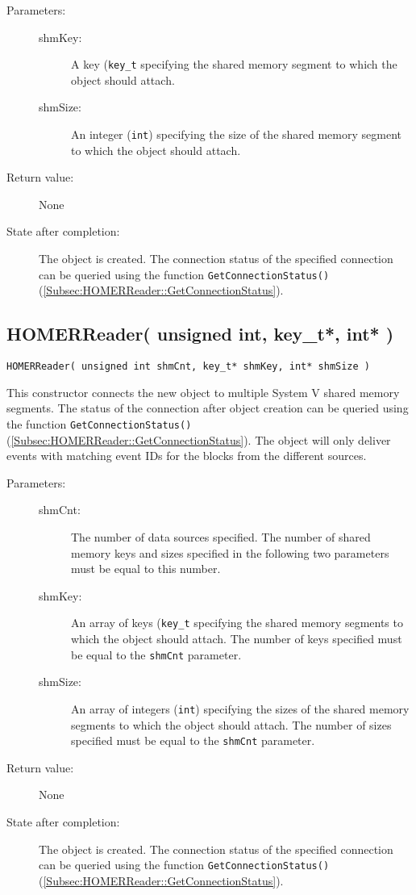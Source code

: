 \documentclass[a4paper,twoside]{article}
\begin{document}
\begin{description}
\item[Parameters:]
	\begin{description}
	\item[shmKey:] A key (\texttt{key\_t} specifying the shared memory segment to which the object should attach.
	\item[shmSize:] An integer (\texttt{int}) specifying the size of the shared memory segment to which the object should attach.
	\end{description}
\item[Return value:] None
\item[State after completion:] The object is created. The connection status of the specified connection can be queried
using the function \texttt{GetConnectionStatus()} (\ref{Subsec:HOMERReader::GetConnectionStatus}). 
\end{description}


\subsection{HOMERReader( unsigned int, key\_t*, int* )}

\texttt{HOMERReader( unsigned int shmCnt, key\_t* shmKey, int* shmSize )}

This constructor connects the new object to multiple System V shared memory segments. The status of the connection after object creation can be queried
using the function \texttt{GetConnectionStatus()} (\ref{Subsec:HOMERReader::GetConnectionStatus}). The object will only deliver events with matching event IDs for the blocks from the 
different sources. 

\begin{description}
\item[Parameters:]
	\begin{description}
	\item[shmCnt:] The number of data sources specified. The number of shared memory keys and sizes specified in the following
	two parameters must be equal to this number.
	\item[shmKey:] An array of keys (\texttt{key\_t} specifying the shared memory segments to which the object should attach. The number of keys
	specified must be equal to the \texttt{shmCnt} parameter. 
	\item[shmSize:] An array of integers (\texttt{int}) specifying the sizes of the shared memory segments to which the object should attach. 
	The number of sizes specified must be equal to the \texttt{shmCnt} parameter. 
	\end{description}
\item[Return value:] None
\item[State after completion:] The object is created. The connection status of the specified connection can be queried
using the function \texttt{GetConnectionStatus()} (\ref{Subsec:HOMERReader::GetConnectionStatus}). 
\end{description}
\end{document}
